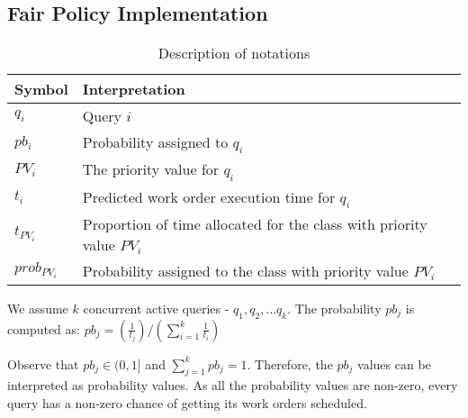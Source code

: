 \subsection{Fair Policy Implementation}\label{ssec:fairness}
\begin{table}[]
	\centering
	\begin{tabular}{|p{}|p{}|}
		\hline
		\textbf{Symbol} & \textbf{Interpretation} \\ \hline
		$q_{i}$ & Query $i$ \\ \hline
		$pb_{i}$ & Probability assigned to $q_{i}$ \\ \hline
		$PV_{i}$ & The priority value for $q_{i}$ \\ \hline
		$t_{i}$ & Predicted work order execution time for $q_{i}$ \\ \hline
		$t_{PV_{i}}$ & Proportion of time allocated for the class with priority value $PV_{i}$ \\ \hline
		$prob_{PV_{i}}$ & Probability assigned to the class with priority value $PV_{i}$ \\ \hline
	\end{tabular}
	\vspace{0.4em}
	\caption{Description of notations}
	\label{table:policy-notations}
	\vspace{-2.5em}
\end{table}


We assume $k$ concurrent active queries - $q_{1}, q_{2}, \ldots q_{k}$. 
The probability $pb_{j}$ is computed as:
$pb_{j} = (\frac{1}{t_{j}})/(\sum\limits_{i=1}^{k}\frac{1}{t_{i}})$

Observe that $pb_{j} \in (0, 1]$ and $\sum\limits_{j=1}^{k}pb_{j} = 1$. 
Therefore, the $pb_{j}$ values can be interpreted as probability values. 
As all the probability values are non-zero, every query has a non-zero chance of getting its work orders scheduled. 

